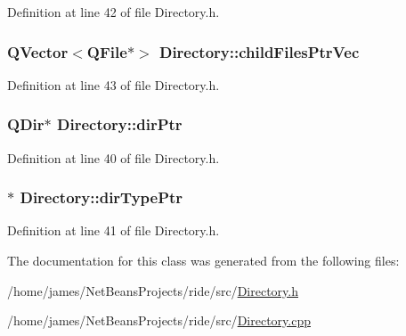 Definition at line 42 of file Directory.\-h.

\hypertarget{class_directory_a3dcbd1171a1c28867b8c718bb0ecf5ff}{
\subsubsection[{child\-Files\-Ptr\-Vec}]{\setlength{\rightskip}{0pt plus 5cm}Q\-Vector$<$Q\-File$\ast$$>$ Directory\-::child\-Files\-Ptr\-Vec\hspace{0.3cm}{\ttfamily [private]}}}\label{class_directory_a3dcbd1171a1c28867b8c718bb0ecf5ff}


Definition at line 43 of file Directory.\-h.

\hypertarget{class_directory_ae8d40a5989c8fe90988aa9517cb87a9a}{
\subsubsection[{dir\-Ptr}]{\setlength{\rightskip}{0pt plus 5cm}Q\-Dir$\ast$ Directory\-::dir\-Ptr\hspace{0.3cm}{\ttfamily [private]}}}\label{class_directory_ae8d40a5989c8fe90988aa9517cb87a9a}


Definition at line 40 of file Directory.\-h.

\hypertarget{class_directory_aeb912c1ed24b2bea1febce142fa3a57e}{
\subsubsection[{dir\-Type\-Ptr}]{$\ast$ Directory\-::dir\-Type\-Ptr\hspace{0.3cm}{\ttfamily [private]}}}\label{class_directory_aeb912c1ed24b2bea1febce142fa3a57e}


Definition at line 41 of file Directory.\-h.



The documentation for this class was generated from the following files\-:\begin{DoxyCompactItemize}
\item 
/home/james/\-Net\-Beans\-Projects/ride/src/\hyperlink{_directory_8h}{Directory.\-h}\item 
/home/james/\-Net\-Beans\-Projects/ride/src/\hyperlink{_directory_8cpp}{Directory.\-cpp}\end{DoxyCompactItemize}
